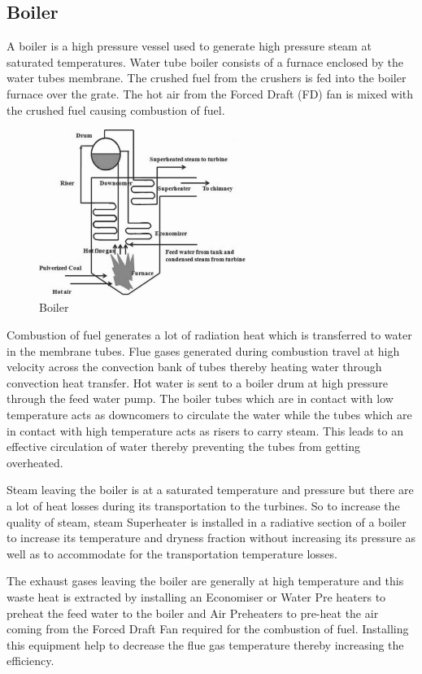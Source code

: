 \documentclass{report}
\begin{document}
\subsection{Boiler}
A boiler is a high pressure vessel used to generate high pressure steam at saturated temperatures. Water tube boiler consists of a furnace enclosed by the water tubes membrane. The crushed fuel from the crushers is fed into the boiler furnace over the grate. The hot air from the Forced Draft (FD) fan is mixed with the crushed fuel causing combustion of fuel.
\begin{figure}[H]
\centering \includegraphics[width=0.6\textwidth]{images/tpp3.png}
\caption{Boiler}
\end{figure}
Combustion of fuel generates a lot of radiation heat which is transferred to water in the membrane tubes. Flue gases generated during combustion travel at high velocity across the convection bank of tubes thereby heating water through convection heat transfer. Hot water is sent to a boiler drum at high pressure through the feed water pump. The boiler tubes which are in contact with low temperature acts as downcomers to circulate the water while the tubes which are in contact with high temperature acts as risers to carry steam. This leads to an effective circulation of water thereby preventing the tubes from getting overheated.

Steam leaving the boiler is at a saturated temperature and pressure but there are a lot of heat losses during its transportation to the turbines. So to increase the quality of steam, steam Superheater is installed in a radiative section of a boiler to increase its temperature and dryness fraction without increasing its pressure as well as to accommodate for the transportation temperature losses.

The exhaust gases leaving the boiler are generally at high temperature and this waste heat is extracted by installing an Economiser or Water Pre heaters to preheat the feed water to the boiler and Air Preheaters to pre-heat the air coming from the Forced Draft Fan required for the combustion of fuel. Installing this equipment help to decrease the flue gas temperature thereby increasing the efficiency.
\end{document}

